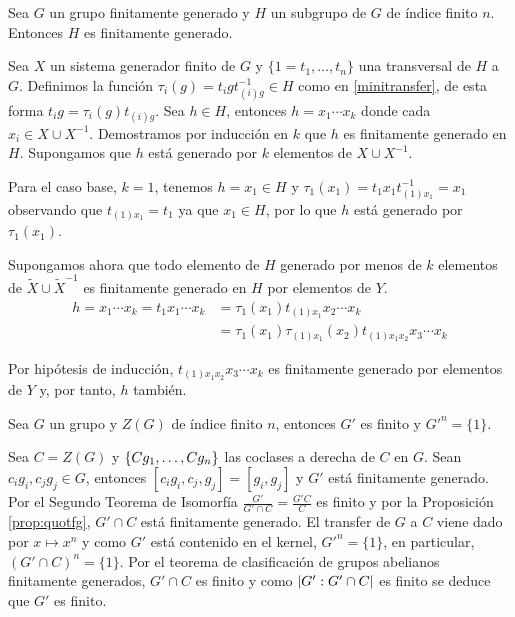 \begin{proposicion}\label{prop:quotfg} %
	Sea $G$ un grupo finitamente generado y $H$ un subgrupo de $G$ de índice finito $n$. Entonces $H$ es finitamente generado.
	\begin{demostracion}
		Sea $X$ un sistema generador finito de $G$ y $\{1=t_1,\ldots,t_n\}$ una transversal de $H$ a $G$. Definimos la función $\tau_{i}(g) = t_igt_{(i)g}^{-1}\in H$ como en \eqref{minitransfer}, de esta forma $t_i g = \tau_{i}(g)t_{(i)g}$.
		Sea $h\in H$, entonces $h=x_1\cdots x_k$ donde cada $x_i\in X\cup X^{-1}$. Demostramos por inducción en $k$ que $h$ es finitamente generado en $H$. Supongamos que $h$ está generado por $k$ elementos de $X\cup X^{-1}$.
		
		Para el caso base, $k=1$, tenemos $h = x_1\in H$ y $\tau_1(x_1) = t_1x_1t_{(1)x_1}^{-1} = x_1$ observando que $t_{(1)x_1} = t_1$ ya que $x_1\in H$, por lo que $h$ está generado por $\tau_1(x_1)$.
		
		Supongamos ahora que todo elemento de $H$ generado por menos de $k$ elementos de $\tilde X\cup\tilde X^{-1}$ es finitamente generado en $H$ por elementos de $Y$. 
		\begin{align*}
			h = x_1\cdots x_k = t_1 x_1\cdots x_k &= \tau_{1}(x_1)t_{(1)x_1} x_2\cdots x_k \\
			&= \tau_{1}(x_1) \tau_{(1)x_1}(x_2)t_{(1)x_1x_2} x_3\cdots x_k
		\end{align*}
		
		Por hipótesis de inducción, $t_{(1)x_1x_2} x_3\cdots x_k$ es finitamente generado por elementos de $Y$ y, por tanto, $h$ también.
	
%		
	\end{demostracion}
\end{proposicion}

\begin{corolario}[Schur]
	Sea $G$ un grupo y $Z(G)$ de índice finito $n$, entonces $G'$ es finito y $G'^n = \{1\}$.
	\begin{demostracion}
		Sea $C=Z(G)$ y $\{Cg_1,\ldots,Cg_n\}$ las coclases a derecha de $C$ en $G$. Sean $c_ig_i,c_jg_j\in G$, entonces $[c_ig_i,c_j,g_j] = [g_i,g_j]$ y $G'$ está finitamente generado. Por el Segundo Teorema de Isomorfía $\frac{G'}{G'\cap C} = \frac{G'C}{C}$ es finito y por la Proposición \ref{prop:quotfg}, $G'\cap C$ está finitamente generado.
		El transfer de $G$ a $C$ viene dado por $x\mapsto x^n$ y como $G'$ está contenido en el kernel, $G'^n = \{1\}$, en particular, $(G'\cap C)^n = \{1\}$. Por el teorema de clasificación de grupos abelianos finitamente generados, $G'\cap C$ es finito y como $\left|G':G'\cap C\right|$ es finito se deduce que $G'$ es finito.
	\end{demostracion}
\end{corolario}


